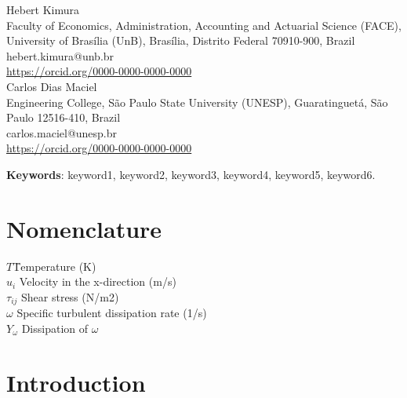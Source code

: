 \documentclass[12pt,a4paper]{article}
\begin{document}
\begin{center}
{\large Hebert Kimura} \\
{\small
Faculty of Economics, Administration, Accounting and Actuarial Science (FACE), University of Brasília (UnB), Brasília, Distrito Federal 70910-900, Brazil \\
hebert.kimura@unb.br \\
\url{https://orcid.org/0000-0000-0000-0000}
} \\[1.2em]

{\large Carlos Dias Maciel} \\
{\small
Engineering College, São Paulo State University (UNESP), Guaratinguetá, São Paulo 12516-410, Brazil \\
carlos.maciel@unesp.br \\
\url{https://orcid.org/0000-0000-0000-0000}
}
\end{center}

\begin{abstract}
Abstracts must be able to stand alone and so cannot contain citations to the paper’s references, equations, etc. An abstract must consist of a single paragraph and be concise. Because of online formatting, abstracts must appear as plain as possible. Three to six keywords must be included. Each keyword should not exceed three words. %
\end{abstract}

\textbf{Keywords}: keyword1, keyword2, keyword3, keyword4, keyword5, keyword6.  

\section*{Nomenclature}

\begin{tabbing}
$T$\qquad \= Temperature (K)\\
$u_i$ \> Velocity in the x-direction (m/s)\\
$\tau_{ij}$ \> Shear stress (N/m2)\\
$\omega$ \> Specific turbulent dissipation rate (1/s)\\
$Y_\omega$ \> Dissipation of $\omega$
\end{tabbing}

\section{Introduction}\label{sec:intro}
\end{document}
